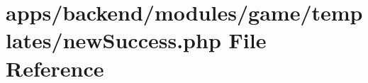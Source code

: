 \hypertarget{backend_2modules_2game_2templates_2new_success_8php}{\section{apps/backend/modules/game/templates/new\-Success.php File Reference}
\label{backend_2modules_2game_2templates_2new_success_8php}
}
